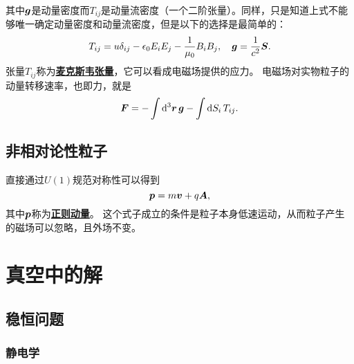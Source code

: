 \documentclass[UTF8, a4paper]{ctexart}
\newcommand*{\concept}[1]{\underline{\textbf{#1}}}
\begin{document}
其中$\vb*{g}$是动量密度而$T_{ij}$是动量流密度（一个二阶张量）。同样，只是知道上式不能够唯一确定动量密度和动量流密度，但是以下的选择是最简单的：
\begin{equation}
    T_{ij} = u \delta_{ij} - \epsilon_0 E_i E_j - \frac{1}{\mu_0} B_i B_j, \quad \vb*{g} = \frac{1}{c^2} \vb*{S}.
\end{equation}
张量$T_{ij}$称为\concept{麦克斯韦张量}，它可以看成电磁场提供的应力。
电磁场对实物粒子的动量转移速率，也即力，就是
\begin{equation}
    \vb*{F} = - \int \dd[3]{\vb*{r}} \vb*{g} - \int \dd{S_i} T_{ij}.
\end{equation}

\subsection{非相对论性粒子}

直接通过$U(1)$规范对称性可以得到
\begin{equation}
    \vb*{p} = m \vb*{v} + q \vb*{A},
\end{equation}
其中$\vb*{p}$称为\concept{正则动量}。
这个式子成立的条件是粒子本身低速运动，从而粒子产生的磁场可以忽略，且外场不变。



\section{真空中的解}

\subsection{稳恒问题}

\subsubsection{静电学}
\end{document}
